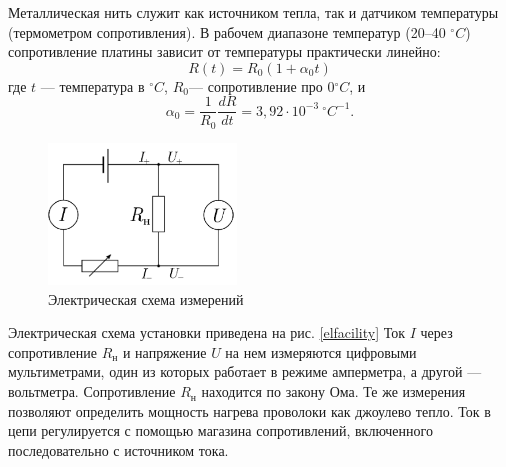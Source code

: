 \documentclass[a4paper,12pt]{article}
\theoremstyle{definition}
\begin{document}
	Металлическая нить служит как источником тепла, так и датчиком температуры (термометром сопротивления). В рабочем диапазоне температур (20–40 $^\circ C$) сопротивление платины зависит от температуры практически линейно:
	\begin{equation}
		R(t)=R_{0}\left(1+\alpha_{0} t\right)
	\end{equation}
	где $t$ --- температура в $^\circ C$, $R_0$--- сопротивление про 0$^\circ C$, и
	\begin{equation}
		\alpha_{0}=\frac{1}{R_{0}} \frac{d R}{d t}=3,92 \cdot 10^{-3} ~^\circ C^{-1}.
	\end{equation}
	
	\begin{figure}[!h]
		\centering
		\includegraphics[width=50mm]{elustan}
		\caption{Электрическая схема измерений}
		\label{elfacility}
	\end{figure}
	
	Электрическая схема установки приведена на рис. \eqref{elfacility} Ток $I$ через сопротивление $R_\text{н}$ и напряжение $U$ на нем измеряются цифровыми мультиметрами, один из которых работает в режиме амперметра, а другой — вольтметра. Сопротивление $R_\text{н}$ находится по закону Ома. Те же измерения позволяют определить мощность нагрева проволоки как джоулево тепло. Ток в цепи регулируется с помощью магазина сопротивлений, включенного последовательно с источником тока.
\end{document}
